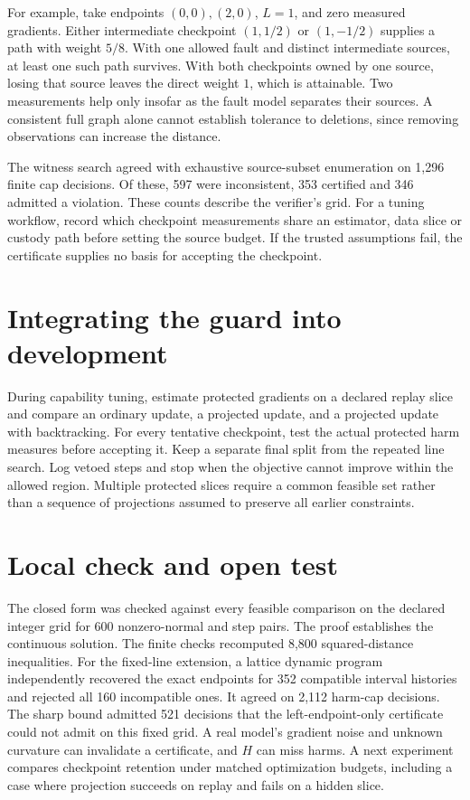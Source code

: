 \documentclass[11pt]{article}
\begin{document}
For example, take endpoints $(0,0),(2,0)$, $L=1$, and zero
measured gradients. Either intermediate checkpoint $(1,1/2)$
or $(1,-1/2)$ supplies a path with weight $5/8$. With one allowed
fault and distinct intermediate sources, at least one such path
survives. With both checkpoints owned by one source, losing that
source leaves the direct weight $1$, which is attainable. Two
measurements help only insofar as the fault model separates their
sources. A consistent full graph alone cannot establish tolerance
to deletions, since removing observations can increase the distance.

The witness search agreed with exhaustive source-subset enumeration
on 1,296 finite cap decisions. Of these, 597 were inconsistent,
353 certified and 346 admitted a violation. These counts describe
the verifier's grid. For a tuning workflow, record which checkpoint
measurements share an estimator, data slice or custody path before
setting the source budget. If the trusted assumptions fail, the
certificate supplies no basis for accepting the checkpoint.

\section{Integrating the guard into development}
During capability tuning, estimate protected gradients on a
declared replay slice and compare an ordinary update, a projected
update, and a projected update with backtracking. For every
tentative checkpoint, test the actual protected harm measures
before accepting it. Keep a separate final split from the repeated
line search. Log vetoed steps and stop when the objective cannot
improve within the allowed region. Multiple protected slices
require a common feasible set rather than a sequence of projections
assumed to preserve all earlier constraints.

\section{Local check and open test}
The closed form was checked against every feasible comparison on
the declared integer grid for 600 nonzero-normal and step pairs.
The proof establishes the continuous solution. The finite checks
recomputed 8,800 squared-distance inequalities. For the
fixed-line extension, a lattice dynamic program independently
recovered the exact endpoints for 352 compatible interval
histories and rejected all 160 incompatible ones. It agreed
on 2,112 harm-cap decisions. The sharp bound admitted 521
decisions that the left-endpoint-only certificate could not
admit on this fixed grid. A real model's
gradient noise and unknown curvature can invalidate a certificate,
and $H$ can miss harms. A next experiment compares checkpoint
retention under matched optimization budgets, including a case
where projection succeeds on replay and fails on a hidden slice.
\end{document}
